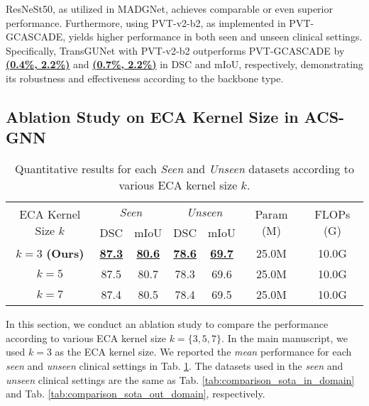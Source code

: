 ResNeSt50, as utilized in MADGNet, achieves comparable or even superior performance. Furthermore, using PVT-v2-b2, as implemented in PVT-GCASCADE, yields higher performance in both seen and unseen clinical settings. Specifically, TransGUNet with PVT-v2-b2 outperforms PVT-GCASCADE by \textbf{\underline{(0.4\%, 2.2\%)}} and \textbf{\underline{(0.7\%, 2.2\%)}} in DSC and mIoU, respectively, demonstrating its robustness and effectiveness according to the backbone type.

\subsection{Ablation Study on ECA Kernel Size in ACS-GNN}

\begin{table}[h]
    \centering
    \scriptsize
    \setlength\tabcolsep{4.0pt} %
    \begin{tabular}{c|cc|cc|c|c}
    \hline
    \multicolumn{1}{c|}{\multirow{2}{*}{ECA Kernel Size $k$}} & \multicolumn{2}{c|}{\textit{Seen}}  & \multicolumn{2}{c|}{\textit{Unseen}} & \multicolumn{1}{c|}{\multirow{2}{*}{Param (M)}}  & \multicolumn{1}{c}{\multirow{2}{*}{FLOPs (G)}} \\ \cline{2-5}
       & DSC & mIoU & DSC & mIoU & & \\ 
    \hline
    $k = 3$ \textbf{(Ours)}                 & \textbf{\underline{87.3}} & \textbf{\underline{80.6}} & \textbf{\underline{78.6}} & \textbf{\underline{69.7}} & 25.0M & 10.0G \\
    $k = 5$ & 87.5 & 80.7 & 78.3 & 69.6 & 25.0M & 10.0G \\
    $k = 7$ & 87.4 & 80.5 & 78.4 & 69.5 & 25.0M & 10.0G \\
    \hline
    \end{tabular}
    \caption{Quantitative results for each \textit{Seen} and \textit{Unseen} datasets according to various ECA kernel size $k$.}
    \label{tab:ablation_eca_kernel_size}
\end{table}

In this section, we conduct an ablation study to compare the performance according to various ECA kernel size $k = \{ 3, 5, 7 \}$. In the main manuscript, we used $k = 3$ as the ECA kernel size. We reported the \textit{mean} performance for each \textit{seen} and \textit{unseen} clinical settings in Tab. \ref{tab:ablation_eca_kernel_size}. The datasets used in the \textit{seen} and \textit{unseen} clinical settings are the same as Tab. \ref{tab:comparison_sota_in_domain} and Tab. \ref{tab:comparison_sota_out_domain}, respectively. 

